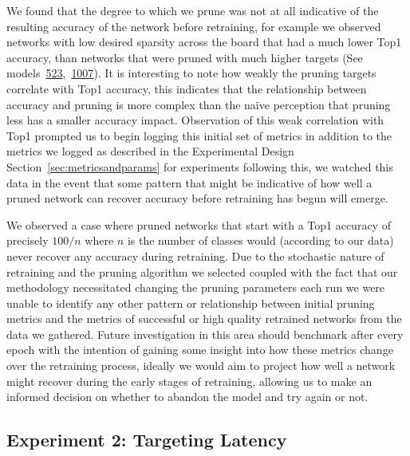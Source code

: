 \documentclass[../Dissertation.tex]{subfiles}
\begin{document}
We found that the degree to which we prune was not at all indicative of the resulting accuracy of the network before retraining, for example we observed networks with low desired sparsity across the board that had a much lower Top1 accuracy, than networks that were pruned with much higher targets (See models~\hyperref[sec:golden-sweep-523]{523},~\hyperref[sec:comfy-sweep-1007]{1007}).
It is interesting to note how weakly the pruning targets correlate with Top1 accuracy, this indicates that the relationship between accuracy and pruning is more complex than the naïve perception that pruning less has a smaller accuracy impact.
Observation of this weak correlation with Top1 prompted us to begin logging this initial set of metrics in addition to the metrics we logged as described in the Experimental Design Section~\ref{sec:metricsandparams} for experiments following this, we watched this data in the event that some pattern that might be indicative of how well a pruned network can recover accuracy before retraining has begun will emerge.

We observed a case where pruned networks that start with a Top1 accuracy of precisely $100 / n$ where $n$ is the number of classes would (according to our data) never recover any accuracy during retraining.
Due to the stochastic nature of retraining and the pruning algorithm we selected coupled with the fact that our methodology necessitated changing the pruning parameters each run we were unable to identify any other pattern or relationship between initial pruning metrics and the metrics of successful or high quality retrained networks from the data we gathered. 
Future investigation in this area should benchmark after every epoch with the intention of gaining some insight into how these metrics change over the retraining process, ideally we would aim to project how well a network might recover during the early stages of retraining, allowing us to make an informed decision on whether to abandon the model and try again or not.


\subsection{Experiment 2: Targeting Latency}\label{sec:Experiment2}
\end{document}
